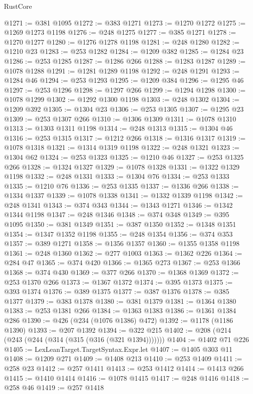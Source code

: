\begin{lexlean}{RustCore}
\begin{coremodule}
@1271 := @381 @1095
@1272 := @383 @1271
@1273 := @1270 @1272
@1275 := @1269 @1273 @1198
@1276 := @248 @1275
@1277 := @385 @1271
@1278 := @1270 @1277
@1280 := @1276 @1278 @1198
@1281 := @248 @1280
@1282 := @1210 @23
@1283 := @253 @1282
@1284 := @1209 @382
@1285 := @1284 @23
@1286 := @253 @1285
@1287 := @1286 @266
@1288 := @1283 @1287
@1289 := @1078 @1288
@1291 := @1281 @1289 @1198
@1292 := @248 @1291
@1293 := @1284 @46
@1294 := @253 @1293
@1295 := @1209 @384
@1296 := @1295 @46
@1297 := @253 @1296
@1298 := @1297 @266
@1299 := @1294 @1298
@1300 := @1078 @1299
@1302 := @1292 @1300 @1198
@1303 := @248 @1302
@1304 := @1209 @392
@1305 := @1304 @23
@1306 := @253 @1305
@1307 := @1295 @23
@1309 := @253 @1307 @266
@1310 := @1306 @1309
@1311 := @1078 @1310
@1313 := @1303 @1311 @1198
@1314 := @248 @1313
@1315 := @1304 @46
@1316 := @253 @1315
@1317 := @1212 @266
@1318 := @1316 @1317
@1319 := @1078 @1318
@1321 := @1314 @1319 @1198
@1322 := @248 @1321
@1323 := @1304 @62
@1324 := @253 @1323
@1325 := @1210 @46
@1327 := @253 @1325 @266
@1328 := @1324 @1327
@1329 := @1078 @1328
@1331 := @1322 @1329 @1198
@1332 := @248 @1331
@1333 := @1304 @76
@1334 := @253 @1333
@1335 := @1210 @76
@1336 := @253 @1335
@1337 := @1336 @266
@1338 := @1334 @1337
@1339 := @1078 @1338
@1341 := @1332 @1339 @1198
@1342 := @248 @1341
@1343 := @374 @343
@1344 := @1343 @1271
@1346 := @1342 @1344 @1198
@1347 := @248 @1346
@1348 := @374 @348
@1349 := @395 @1095
@1350 := @381 @1349
@1351 := @387 @1350
@1352 := @1348 @1351
@1354 := @1347 @1352 @1198
@1355 := @248 @1354
@1356 := @374 @353
@1357 := @389 @1271
@1358 := @1356 @1357
@1360 := @1355 @1358 @1198
@1361 := @248 @1360
@1362 := @277 @1003
@1363 := @1362 @226
@1364 := @284 @47
@1365 := @374 @420
@1366 := @1365 @273
@1367 := @253 @1366
@1368 := @374 @430
@1369 := @377 @266
@1370 := @1368 @1369
@1372 := @253 @1370 @266
@1373 := @1367 @1372
@1374 := @395 @1373
@1375 := @393 @1374
@1376 := @389 @1375
@1377 := @387 @1376
@1378 := @385 @1377
@1379 := @383 @1378
@1380 := @381 @1379
@1381 := @1364 @1380
@1383 := @253 @1381 @266
@1384 := @1363 @1383
@1386 := @1361 @1384 @286
@1390 := @426 (@234 (@1076 @1386) @472)
@1392 := @1178 (@1186 @1390)
@1393 := @207 @1392
@1394 := @322 @215
@1402 := @208 (@214 (@243 (@244 (@314 (@315 (@316 (@321 @1394)))))))
@1404 := @1402 @71 @226
@1405 := LexLeanTarget.TargetSyntax.Expr.let
@1407 := @1405 @303 @11
@1408 := @1209 @271
@1409 := @1408 @213
@1410 := @253 @1409
@1411 := @258 @23
@1412 := @257 @1411
@1413 := @253 @1412
@1414 := @1413 @266
@1415 := @1410 @1414
@1416 := @1078 @1415
@1417 := @248 @1416
@1418 := @258 @46
@1419 := @257 @1418

\end{coremodule}
\end{lexlean}
